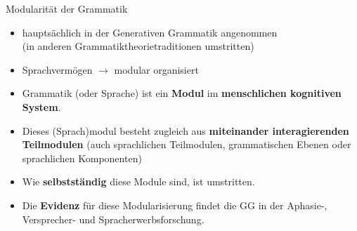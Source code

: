 \begin{frame}{Modularität der Grammatik}
	
\begin{itemize}
	\item hauptsächlich in der Generativen Grammatik angenommen\\
              (in anderen Grammatiktheorietraditionen umstritten)
	\medskip
	\item Sprachvermögen $\rightarrow$ modular organisiert
	\medskip
	\item<2-> Grammatik (oder Sprache) ist ein \textbf{Modul} im \textbf{menschlichen kognitiven System}.
	\item<2-> Dieses (Sprach)modul besteht zugleich aus \textbf{miteinander interagierenden Teilmodulen} (auch sprachlichen Teilmodulen, grammatischen Ebenen oder sprachlichen Komponenten)
	\medskip
	\item<3-> Wie \textbf{selbstständig} diese Module sind, ist umstritten.
	\medskip
	\item<3-> Die \textbf{Evidenz} für diese Modularisierung findet die GG in der Aphasie-, Versprecher- und Spracherwerbsforschung.  
\end{itemize}

\end{frame}


